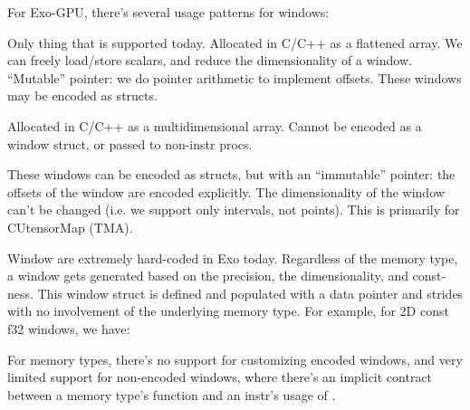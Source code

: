 \filbreak
{}



\filbreak
{}



\filbreak
{}



\filbreak
{}

For Exo-GPU, there's several usage patterns for windows:

\filbreak
{} Only thing that is supported today.
Allocated in C/C++ as a flattened array.
We can freely load/store scalars, and reduce the dimensionality of a window.
``Mutable'' pointer: we do pointer arithmetic to implement offsets.
These windows may be encoded as structs.



\filbreak
{} Allocated in C/C++ as a multidimensional array.
Cannot be encoded as a window struct, or passed to non-instr procs.



\filbreak
{}
These windows can be encoded as structs, but with an ``immutable'' pointer: the offsets of the window are encoded explicitly.
The dimensionality of the window can't be changed (i.e. we support only intervals, not points).
This is primarily for CUtensorMap (TMA).



\filbreak
{}

Window are extremely hard-coded in Exo today.
Regardless of the memory type, a window gets generated based on the precision, the dimensionality, and const-ness.
This window struct is defined and populated with a data pointer and strides with no involvement of the underlying memory type. For example, for 2D const f32 windows, we have:



\filbreak
For memory types, there's no support for customizing encoded windows, and very limited support for non-encoded windows, where there's an implicit contract between a memory type's  function and an instr's usage of  .

